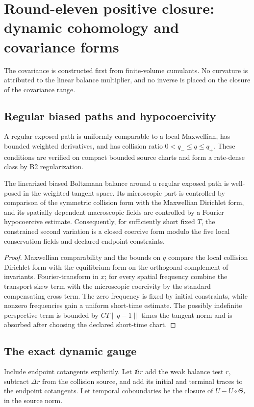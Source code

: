\section{Round-eleven positive closure: dynamic cohomology and covariance forms}
\label{sec:r11-b3}

The covariance is constructed first from finite-volume cumulants.  No
curvature is attributed to the linear balance multiplier, and no inverse is
placed on the closure of the covariance range.

\subsection{Regular biased paths and hypocoercivity}
A regular exposed path is uniformly comparable to a local Maxwellian, has
bounded weighted derivatives, and has collision ratio
$0<q_-\le q\le q_+$.  These conditions are verified on compact bounded
source charts and form a rate-dense class by B2 regularization.

\begin{theorem}
\label{thm:r11-b3-energy}
The linearized biased Boltzmann balance around a regular exposed path is
well-posed in the weighted tangent space.  Its microscopic part is controlled
by comparison of the symmetric collision form with the Maxwellian Dirichlet
form, and its spatially dependent macroscopic fields are controlled by a
Fourier hypocoercive estimate.  Consequently, for sufficiently short fixed
$T$, the constrained second variation is a closed coercive form modulo the
five local conservation fields and declared endpoint constraints.
\end{theorem}

\begin{proof}
Maxwellian comparability and the bounds on $q$ compare the local collision
Dirichlet form with the equilibrium form on the orthogonal complement of
invariants.  Fourier-transform in $x$; for every spatial frequency combine
the transport skew term with the microscopic coercivity by the standard
compensating cross term.  The zero frequency is fixed by initial constraints,
while nonzero frequencies gain a uniform short-time estimate.  The possibly
indefinite perspective term is bounded by $CT\|q-1\|$ times the tangent norm
and is absorbed after choosing the declared short-time chart.
\end{proof}

\subsection{The exact dynamic gauge}
Include endpoint cotangents explicitly.  Let $\mathfrak G r$ add the weak
balance test $r$, subtract $\Delta r$ from the collision source, and add its
initial and terminal traces to the endpoint cotangents.  Let temporal
coboundaries be the closure of $U-U\circ\Theta_t$ in the source norm.

